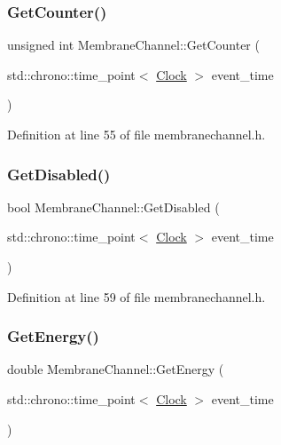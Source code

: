 \subsubsection{\texorpdfstring{Get\+Counter()}{GetCounter()}}
{\footnotesize\ttfamily unsigned int Membrane\+Channel\+::\+Get\+Counter (\begin{DoxyParamCaption}\item[{std\+::chrono\+::time\+\_\+point$<$ \hyperlink{universe_8h_a0ef8d951d1ca5ab3cfaf7ab4c7a6fd80}{Clock} $>$}]{event\+\_\+time }\end{DoxyParamCaption})\hspace{0.3cm}{\ttfamily [inline]}}



Definition at line 55 of file membranechannel.\+h.

\mbox{\label{class_membrane_channel_afde030429a160621a2255ab8a2d689b8}} 
\subsubsection{\texorpdfstring{Get\+Disabled()}{GetDisabled()}}
{\footnotesize\ttfamily bool Membrane\+Channel\+::\+Get\+Disabled (\begin{DoxyParamCaption}\item[{std\+::chrono\+::time\+\_\+point$<$ \hyperlink{universe_8h_a0ef8d951d1ca5ab3cfaf7ab4c7a6fd80}{Clock} $>$}]{event\+\_\+time }\end{DoxyParamCaption})\hspace{0.3cm}{\ttfamily [inline]}}



Definition at line 59 of file membranechannel.\+h.

\mbox{\label{class_membrane_channel_a25b542d8156c42ed785eebbea0db21a7}} 
\subsubsection{\texorpdfstring{Get\+Energy()}{GetEnergy()}}
{\footnotesize\ttfamily double Membrane\+Channel\+::\+Get\+Energy (\begin{DoxyParamCaption}\item[{std\+::chrono\+::time\+\_\+point$<$ \hyperlink{universe_8h_a0ef8d951d1ca5ab3cfaf7ab4c7a6fd80}{Clock} $>$}]{event\+\_\+time }\end{DoxyParamCaption})\hspace{0.3cm}{\ttfamily [inline]}}



